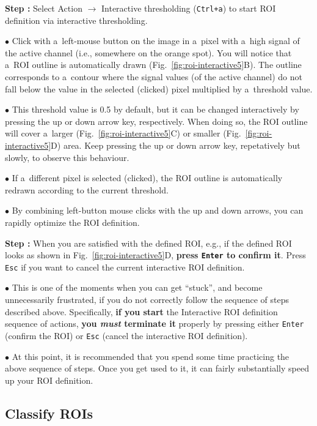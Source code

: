 \documentclass[a4paper, 11pt]{article}
\newcommand{\ttt}[1]{\texttt{#1}}
\newcommand{\lans}[1]{{\color{magenta}#1}}
\newcommand\ra{\rightarrow}
\newcounter{step}
\newcommand\s{\addtocounter{step}{1}\vskip5pt\noindent\textbf{Step \thestep:}{ }}
\newcommand\bul{\vskip5pt\noindent$\bullet${ }}
\newcommand\bb[1]{\textbf{#1}}
\begin{document}
\s Select \lans{Action} $\ra$ \lans{Interactive thresholding} (\ttt{Ctrl+a}) to start ROI definition via interactive thresholding.

\bul Click with a~left-mouse button on the image in a~pixel with a~high signal of the active channel (i.e., somewhere on the orange spot). You will notice that a~ROI outline is automatically drawn (Fig.~\ref{fig:roi-interactive5}B). The outline corresponds to a~contour where the signal values (of the active channel) do not fall below the value in the selected (clicked) pixel multiplied by a~threshold value.

\bul This threshold value is 0.5 by default, but it can be changed interactively by pressing the \lans{up} or \lans{down} arrow key, respectively. When doing so, the ROI outline will cover a~larger (Fig.~\ref{fig:roi-interactive5}C) or smaller (Fig.~\ref{fig:roi-interactive5}D) area. Keep pressing the \lans{up} or \lans{down} arrow key, repetatively but slowly, to observe this behaviour. 

\bul If a~different pixel is selected (clicked), the ROI outline is automatically redrawn according to the current threshold.

\bul By combining left-button mouse clicks with the \lans{up} and \lans{down} arrows, you can rapidly optimize the ROI definition.

\s When you are satisfied with the defined ROI, e.g., if the defined ROI looks as shown in Fig.~\ref{fig:roi-interactive5}D, \bb{press \ttt{Enter} to confirm it}. Press \ttt{Esc} if you want to cancel the current interactive ROI definition.

\bul This is one of the moments when you can get ``stuck'', and become unnecessarily frustrated, if you do not correctly follow the sequence of steps described above. Specifically, \bb{if you start} the \lans{Interactive ROI definition} sequence of actions, \bb{you \emph{must} terminate it} properly by pressing either \ttt{Enter} (confirm the ROI) or \ttt{Esc} (cancel the interactive ROI definition). 

\bul At this point, it is recommended that you spend some time practicing the above sequence of steps. Once you get used to it, it can fairly substantially speed up your ROI definition.


\subsection{Classify ROIs}
\end{document}
